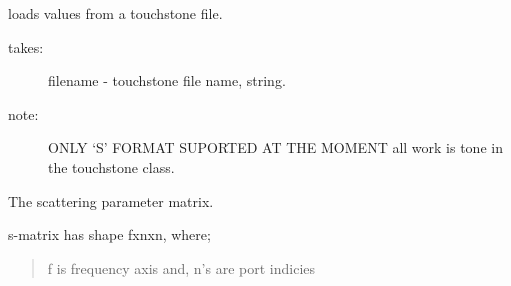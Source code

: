 \documentclass[letterpaper,10pt,english]{sphinxmanual}
\begin{document}
\begin{fulllineitems}
\begin{fulllineitems}
\label{api/mwavepy:mwavepy.network.Network.read_touchstone}
loads  values from a touchstone file.
\begin{description}
\item[{takes:}] \leavevmode
filename - touchstone file name, string.

\item[{note: }] \leavevmode
ONLY `S' FORMAT SUPORTED AT THE MOMENT 
all work is tone in the touchstone class.

\end{description}

\end{fulllineitems}


\begin{fulllineitems}
\label{api/mwavepy:mwavepy.network.Network.s}
The scattering parameter matrix.

s-matrix has shape fxnxn, 
where;
\begin{quote}

f is frequency axis and,
n's are port indicies
\end{quote}

\end{fulllineitems}


\begin{fulllineitems}
\label{api/mwavepy:mwavepy.network.Network.s11}
\end{fulllineitems}


\begin{fulllineitems}
\label{api/mwavepy:mwavepy.network.Network.s12}
\end{fulllineitems}


\begin{fulllineitems}
\label{api/mwavepy:mwavepy.network.Network.s21}
\end{fulllineitems}



\end{fulllineitems}
\end{document}
